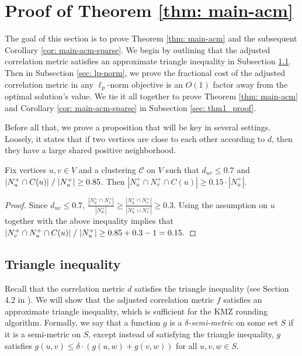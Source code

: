 \section{Proof of Theorem \ref{thm: main-acm}}\label{sec: proofs}

The goal of this section is to prove Theorem \ref{thm: main-acm} and the subsequent Corollary 
\ref{cor: main-acm-sparse}.
We begin by outlining that the adjusted correlation metric satisfies an approximate triangle inequality in Subsection \ref{sec: tri-ineq}. 
Then in Subsection \ref{sec: lp-norm}, we prove the fractional cost of the adjusted correlation metric in any $\ell_p$-norm objective is an $O(1)$ factor away from the optimal solution's value.
We tie it all together to prove Theorem \ref{thm: main-acm} and Corollary 
\ref{cor: main-acm-sparse} in Subsection \ref{sec: thm1_proof}.

Before all that, we prove a proposition that will be key in several settings. Loosely, it states that if two vertices are close to each other according to $d$, then they have a large shared positive neighborhood. 
 \begin{proposition} \label{prop: pos_overlap}
     Fix vertices $u,v \in V$ and a clustering $\mathcal{C}$ on $V$ such that $d_{uv} \leq 0.7$ and $|N_u^+ \cap C(u)|\hspace{1mm}/ \hspace{1mm} |N_u^+|\geq 0.85$.
     Then $|N_u^+ \cap N_v^+ \cap C(u)| \geq 0.15 \cdot |N_u^+|$.
 \end{proposition}
\begin{proof}
    Since $d_{uv} \leq 0.7$, 
    $\frac{|N_u^+ \cap N_v^+|}{|N_u^+|} \geq \frac{|N_u^+ \cap N_v^+|}{|N_u^+ \cup N_v^+|} \geq 0.3.$
    Using the assumption on $u$ together with the above inequality implies that $|N_v^+ \cap N_u^+ \cap C(u)|\hspace{1mm}/ \hspace{1mm}|N_u^+| \geq 0.85 + 0.3 - 1 = 0.15.$
\end{proof}


\subsection{Triangle inequality}\label{sec: tri-ineq}
Recall that the correlation metric $d$ satisfies the triangle inequality (see Section 4.2 in \cite{DMN23}). We will show that the adjusted correlation metric $f$ satisfies an approximate triangle inequality, which is sufficient for the KMZ rounding algorithm. 
Formally, we say that a function $g$ is a \emph{$\delta$-semi-metric} on some set $S$ if it is a semi-metric on $S$, except instead of satisfying the triangle inequality, $g$ satisfies 
$g(u,v) \leq \delta \cdot( g(u,w) + g(v,w))$ for all $u,v,w \in S$. 


